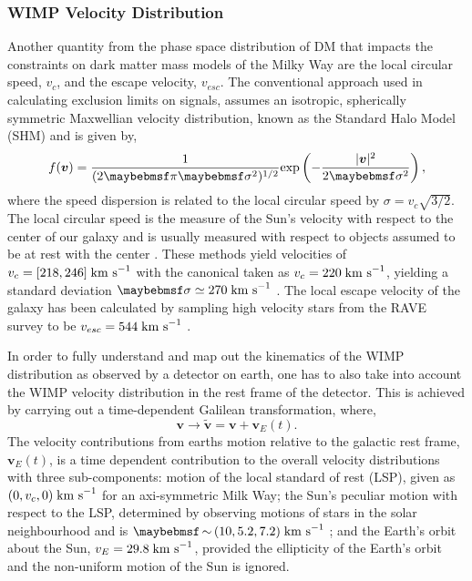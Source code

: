 \subsubsection{WIMP Velocity Distribution}
\label{subsec:WIMP_velocity}

Another quantity from the phase space distribution of DM that impacts the constraints on dark matter mass models of the Milky Way are the local circular speed, $v_{c}$, and the escape velocity, $v_{esc}$. The conventional approach used in calculating exclusion limits on signals, assumes an isotropic, spherically symmetric Maxwellian velocity distribution, known as the Standard Halo Model (SHM) and is given by,
%
\begin{equation} \label{eq:dm_velocity_distribution}
    f(\boldsymbol{v}) = \frac{1}{(2\pi{}\sigma^{2})^{1/2}} \MathText{exp} \left( -\frac{|\boldsymbol{v}|^{2}}{2\sigma{}^2} \right),
\end{equation}
%
where the speed dispersion is related to the local circular speed by $\sigma = v_{c}\sqrt{3/2}$. The local circular speed is the measure of the Sun's velocity with respect to the center of our galaxy and is usually measured with respect to objects assumed to be at rest with the center \cite{Bovy_2012}. These methods yield velocities of $v_{c} = [218, 246] \; \text{km s}^{-1}$ with the canonical taken as $v_{c} = 220 \; \text{km s}^{-1}$, yielding a standard deviation $\sigma \simeq 270 \; \MathText{km s}^{-1}$ \cite{canonical_speed}. The local escape velocity of the galaxy has been calculated by sampling high velocity stars from the RAVE survey to be $v_{esc} = 544 \; \text{km s}^{-1}$ \cite{Smith_2007}.

In order to fully understand and map out the kinematics of the WIMP distribution as observed by a detector on earth, one has to also take into account the WIMP velocity distribution in the rest frame of the detector. This is achieved by carrying out a time-dependent Galilean transformation, where, 
%
\begin{equation} \label{eq:dm_velocity_distribution}
    \boldsymbol{v} \rightarrow \boldsymbol{\tilde{v}} = \boldsymbol{v} + \boldsymbol{v}_{E}(t).
\end{equation}
%
The velocity contributions from earths motion relative to the galactic rest frame, $\boldsymbol{v}_{E}(t)$, is a time dependent contribution to the overall velocity distributions with three sub-components: motion of the local standard of rest (LSP), given as $(0,v_{c},0) \; \text{km s}^{-1}$ for an axi-symmetric Milk Way; the Sun's peculiar motion with respect to the LSP, determined by observing motions of stars in the solar neighbourhood and is $\sim(10, 5.2, 7.2) \; \MathText{km s}^{-1}$ \cite{Dehnen_1998}; and the Earth's orbit about the Sun, $v_{E} = 29.8 \; \text{km s}^{-1}$, provided the ellipticity of the Earth's orbit and the non-uniform motion of the Sun is ignored.

